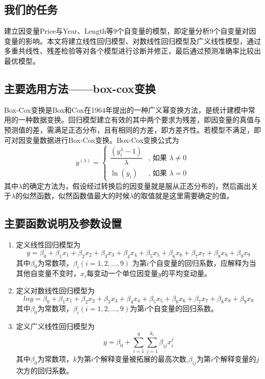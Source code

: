 \documentclass[a4paper,12pt,onecolumn,oneside]{article}
\begin{document}
\subsection{我们的任务}
建立因变量Price与Year、Length等9个自变量的模型，即定量分析9个自变量对因变量的影响。本文将建立线性回归模型、对数线性回归模型及广义线性模型，通过多重共线性、残差检验等对各个模型进行诊断并修正，最后通过预测准确率比较出最优模型。\par 

\subsection{主要选用方法——box-cox变换}
Box-Cox变换是Box和Cox在1964年提出的一种广义幂变换方法，是统计建模中常用的一种数据变换。回归模型建立有效的其中两个要求为残差，即因变量的真值与预测值的差，需满足正态分布，且有相同的方差，即方差齐性。若模型不满足，即可对因变量数据进行Box-Cox变换。Box-Cox变换公式为
$$
	y^{(\lambda)} =
	\begin{cases}
		\dfrac{(y_i^\lambda -1)}{\lambda} & \text{, 如果 } \lambda \neq 0 \\
		\ln(y_i) & \text{, 如果 } \lambda = 0
	\end{cases}
$$
其中$\lambda$的确定方法为，假设经过转换后的因变量就是服从正态分布的，然后画出关于$\lambda$的似然函数，似然函数值最大的时候$\lambda$的取值就是这里需要确定的值。
\subsection{主要函数说明及参数设置}
\begin{enumerate}
	\item 定义线性回归模型为
\begin{equation*}
	y=\beta_0+\beta_1 x_1+\beta_2 x_2+\beta_3 x_3+\beta_4 x_4+\beta_5 x_5+\beta_6 x_6+\beta_7 x_7+\beta_8 x_8+\beta_9 x_9
\end{equation*}
其中$\beta_0$为常数项，$\beta_i (i=1,2,...,9)$ 为第$i$个自变量的回归系数，应解释为当其他自变量不变时，$x_i$每变动一个单位因变量$y$的平均变动量。
\item 定义对数线性回归模型为
\begin{equation*}
	ln y=\beta_0+\beta_1 x_1+\beta_2 x_2+\beta_3 x_3+\beta_4 x_4+\beta_5 x_5+\beta_6 x_6+\beta_7 x_7+\beta_8 x_8+\beta_9 x_9
\end{equation*}
	其中$\beta_0$为常数项，$\beta_i (i=1,2,...,9)$为第$i$个自变量的回归系数。
	\item 定义广义线性回归模型为
	\begin{equation*}
		y = \beta_0 + \sum_{i=1}^{9}\sum_{j=1}^{k_i}\beta_{ij}x_i^j
	\end{equation*}
	其中$\beta_0$为常数项，$k$为第$i$个解释变量被拓展的最高次数,$\beta_{ij}$为第$i$个解释变量的$j$次方的回归系数。
	\end{enumerate}
\end{document}
